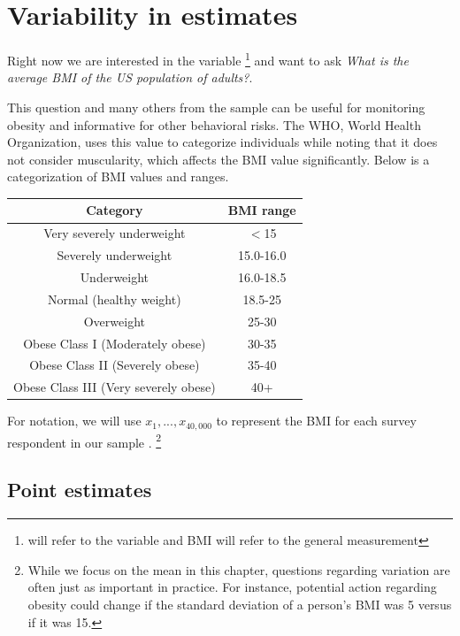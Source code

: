 \section{Variability in estimates}
\label{variabilityInEstimates}


Right now we are interested in the  variable \footnote{ will refer to the variable and BMI will refer to the general measurement} and want to ask \emph{What is the average BMI of the US population of adults?}. 

This question and many others from the  sample can be useful for monitoring obesity and informative for other behavioral risks. The WHO, World Health Organization, uses this value to categorize individuals while noting that it does not consider muscularity, which affects the BMI value significantly. Below is a categorization of BMI values and ranges. 
\begin{center}
\begin{tabular}{|c|c|}
\hline 
Category & BMI range\tabularnewline
\hline 
\hline 
Very severely underweight  & $<$15\tabularnewline
\hline 
Severely underweight & 15.0-16.0\tabularnewline
\hline 
Underweight & 16.0-18.5\tabularnewline
\hline 
Normal (healthy weight) & 18.5-25\tabularnewline
\hline 
Overweight & 25-30\tabularnewline
\hline 
Obese Class I (Moderately obese) & 30-35\tabularnewline
\hline 
Obese Class II (Severely obese) & 35-40\tabularnewline
\hline 
Obese Class III (Very severely obese) & 40+\tabularnewline
\hline 
\end{tabular}
\end{center}

For notation, we will use $x_1, ..., x_{40,000}$ to represent the BMI for each survey respondent in our sample . \footnote{While we focus on the mean in this chapter, questions regarding variation are often just as important in practice. For instance, potential action regarding obesity could change if the standard deviation of a person's BMI was 5 versus if it was 15.} 

\subsection{Point estimates}
\label{pointEstimates}


